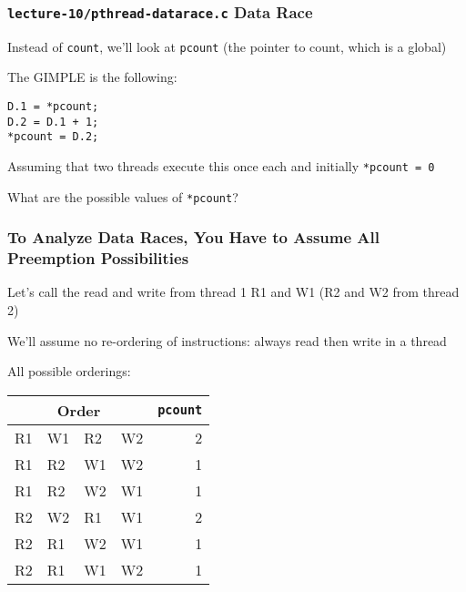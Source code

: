   \begin{frame}[fragile]
    \frametitle{\texttt{lecture-10/pthread-datarace.c} Data Race}

    Instead of \texttt{count}, we'll look at \texttt{pcount} (the pointer to
    count, which is a global)

    \vspace{2em}

    The GIMPLE is the following:
    \begin{lstlisting}
D.1 = *pcount;
D.2 = D.1 + 1;
*pcount = D.2;
    \end{lstlisting}

    \vspace{2em}
    
    Assuming that two threads execute this once each
    and initially \texttt{*pcount = 0}

    \hspace{2em} What are the possible values of \texttt{*pcount}?
  \end{frame}

  \begin{frame}
    \frametitle{To Analyze Data Races, You Have to Assume All Preemption Possibilities}

    Let's call the read and write from thread 1 R1 and W1 (R2 and W2 from thread 2)

    \vspace{2em}

    We'll assume no re-ordering of instructions: always read then write in
    a thread

    \vspace{2em}

    All possible orderings:
    \begin{center}
      \begin{tabular}{llll|r}
        \multicolumn{4}{c|}{Order} & {\tt *pcount}\\
        \hline
        R1 & W1 & R2 & W2 & 2 \\
        R1 & R2 & W1 & W2 & 1 \\
        R1 & R2 & W2 & W1 & 1 \\
        R2 & W2 & R1 & W1 & 2 \\
        R2 & R1 & W2 & W1 & 1 \\
        R2 & R1 & W1 & W2 & 1 \\
      \end{tabular}
    \end{center}
  \end{frame}

